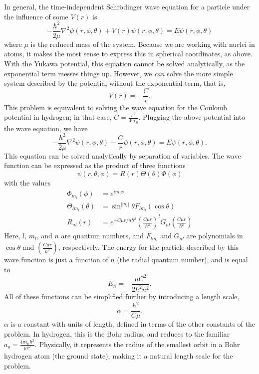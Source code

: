 \documentclass[12pt,twoside]{reedthesis}
\newcommand{\eqn}[1]{\begin{equation}#1\end{equation}}
\begin{document}
In general, the time-independent Schr\"odinger wave equation for a particle under the influence of some $V(r)$ is
\eqn{
-\frac{\hbar^2}{2\mu}\nabla^2\psi(r,\phi,\theta) + V(r)\psi (r,\phi,\theta) = E \psi(r,\phi,\theta)
\label{eq:TIDSWE-general}
}
where $\mu$ is the reduced mass of the system. Because we are working with nuclei in atoms, it makes the most sense to express this in spherical coordinates, as above. With the Yukawa potential, this equation cannot be solved analytically, as the exponential term messes things up. However, we \textit{can} solve the more simple system described by the potential without the exponential term, that is,
\eqn{
 V(r) = -\frac{C}{r}\mbox{.}
 }
 This problem is equivalent to solving the wave equation for the Coulomb potential in hydrogen; in that case, $C = \frac{e^2}{4\pi \epsilon_0}$. Plugging the above potential into the wave equation, we have
 \eqn{
 -\frac{\hbar^2}{2\mu}\nabla^2\psi(r,\phi,\theta) -\frac{C}{r}\psi (r,\phi,\theta) = E \psi(r,\phi,\theta)\mbox{.}
 }
This equation can be solved analytically by separation of variables. The wave function can be expressed as the product of three functions
\eqn{
\psi(r,\theta,\phi) = R(r)\Theta(\theta)\Phi(\phi)
}
with the values
\begin{align*}
\Phi_{m_l}(\phi) &= e^{im_l\phi} \\
\Theta_{lm_l}(\theta) &= \sin^{|m_l|}{\theta} F_{l m_l}(\cos{\theta}) \\
R_{n l}(r) &= e^{-C \mu r / n \hbar^2}\left(\frac{C \mu r}{\hbar^2}\right)^{l} G_{n l}\left(\frac{C \mu r}{\hbar^2}\right)
\end{align*}
Here, $l$, $m_l$, and $n$ are quantum numbers, and $F_{l m_l}$ and $G_{n l}$ are polynomials in $\cos{\theta}$ and $\left(\frac{C \mu r}{\hbar^2} \right)$, respectively. The energy for the particle described by this wave function is just a function of $n$ (the radial quantum number), and is equal to
\eqn{
E_n = -\frac{\mu C^2}{2\hbar^2 n^2}\mbox{.}
}
All of these functions can be simplified further by introducing a length scale, 
\eqn{
\alpha = \frac{\hbar^2}{C \mu}\mbox{.}
\label{eq:bohrradius}
}
$\alpha$ is a constant with units of length, defined in terms of the other constants of the problem. In hydrogen, this is the Bohr radius, and reduces to the familiar $a_o = \frac{4\pi \epsilon_0 \hbar^2}{\mu e^2}$. Physically, it represents the radius of the smallest orbit in a Bohr hydrogen atom (the ground state), making it a natural length scale for the problem.
\end{document}
